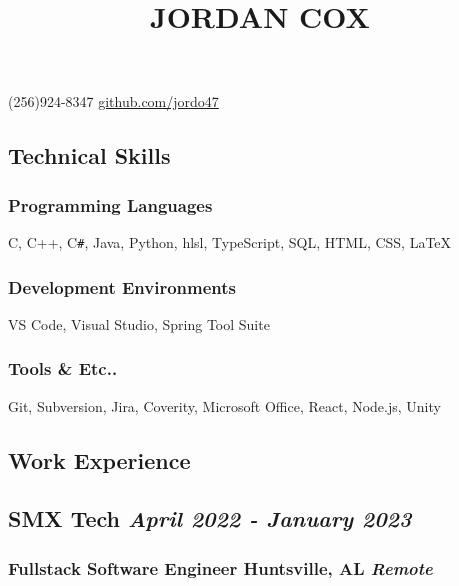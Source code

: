\documentclass{article}
\begin{document}
\title{\vspace*{-4em}\textbf{JORDAN COX}}
\author{}
\date{}

\maketitle

\begin{center}
    \vspace*{-7em}
    (256)924-8347  \url{github.com/jordo47}
\end{center}

\subsection*{Technical Skills}
\subsubsection*{\hspace*{0.5cm} Programming Languages}
\hspace*{1cm} C, C++, C\verb|#|, Java, Python, hlsl, TypeScript, SQL, HTML, CSS, {\LaTeX}

\subsubsection*{\hspace*{0.5cm} Development Environments}
\hspace*{1cm} VS Code, Visual Studio, Spring Tool Suite

\subsubsection*{\hspace*{0.5cm} Tools \& Etc..}
\hspace*{1cm} Git, Subversion, Jira, Coverity, Microsoft Office, React, Node.js, Unity


\subsection*{Work Experience}

\subsection*{\hspace*{0.15cm} SMX Tech \hfill \textit{April 2022 - January 2023}}
\subsubsection*{\hspace*{0.15cm} Fullstack Software Engineer \hfill Huntsville, AL \textit{Remote}}
\end{document}
